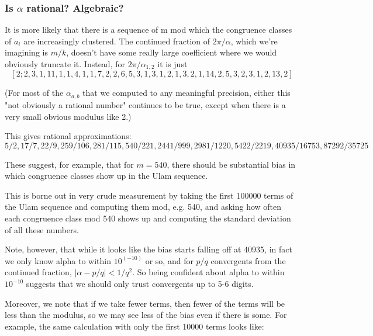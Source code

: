 \documentclass{article}
\theoremstyle{definition}
\theoremstyle{remark}
\numberwithin{equation}{section}
\begin{document}
{\color{red}
\subsubsection{Is $\alpha$ rational?  Algebraic?}

It is more likely that there is a sequence of m mod which the
congruence classes of $a_i$ are increasingly clustered.  The continued
fraction of $2\pi/\alpha$, which we're imagining is $m/k$, doesn't have some
really large coefficient where we would obviously truncate it.
Instead, for $2\pi/\alpha_{1,2}$ it is just
\[[2; 2, 3, 1, 11, 1, 1, 4, 1, 1, 7, 2, 2, 6, 5, 3, 1, 3, 1, 2, 1, 3, 2, 1, 14, 2, 5, 3, 2, 3, 1, 2, 13, 2]\]

(For most of the $\alpha_{a,b}$ that we computed to any meaningful
precision, either this "not obviously a rational number" continues to
be true, except when there is a very small obvious modulus like 2.)

This gives rational approximations: 
\[5/2, 17/7, 22/9, 259/106, 281/115, 540/221, 2441/999, 2981/1220, 5422/2219, 40935/16753, 87292/35725\]



These suggest, for example, that for $m = 540$, there should be
substantial bias in which congruence classes show up in the Ulam
sequence.

This is borne out in very crude measurement by taking the first
100000 terms of the Ulam sequence and computing them mod, e.g. 540, and
asking how often each congruence class mod 540 shows up and computing
the standard deviation of all these numbers.


Note, however, that while it looks like the bias starts falling off at
40935, in fact we only know alpha to within $10^(-10)$ or so, and for
$p/q$ convergents from the continued fraction,
$|\alpha - p/q| < 1/q^2$.  So being confident about alpha to within
$10^{-10}$ suggests that we should only trust convergents up to 5-6
digits.

Moreover, we note that if we take fewer terms, then fewer of the terms
will be less than the modulus, so we may see less of the bias even if
there is some.  For example, the same calculation with only the first
10000 terms looks like:

}
\end{document}

